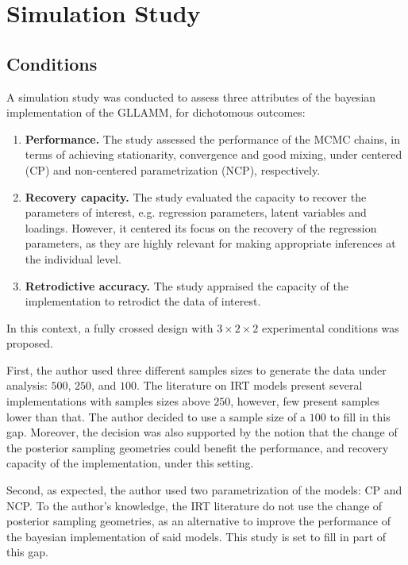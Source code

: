 \chapter{Simulation Study} \label{chap:simulation}

\section{Conditions} \label{sec:conditions}

A simulation study was conducted to assess three attributes of the bayesian implementation of the GLLAMM, for dichotomous outcomes:
%
\begin{enumerate}
	\item \textbf{Performance.} The study assessed the performance of the MCMC chains, in terms of achieving stationarity, convergence and good mixing,  under centered (CP) and non-centered parametrization (NCP), respectively.
	\item \textbf{Recovery capacity.} The study evaluated the capacity to recover the parameters of interest, e.g. regression parameters, latent variables and loadings. However, it centered its focus on the recovery of the regression parameters, as they are highly relevant for making appropriate inferences at the individual level.
	\item \textbf{Retrodictive accuracy.} The study appraised the capacity of the implementation to retrodict the data of interest.
\end{enumerate} 

\noindent In this context, a fully crossed design with $3 \times 2 \times 2$ experimental conditions was proposed. 

First, the author used three different samples sizes to generate the data under analysis: $500$, $250$, and $100$. The literature on IRT models present several implementations with samples sizes above $250$, however, few present samples lower than that. The author decided to use a sample size of a $100$ to fill in this gap. Moreover, the decision was also supported by the notion that the change of the posterior sampling geometries could benefit the performance, and recovery capacity of the implementation, under this setting.

Second, as expected, the author used two parametrization of the models: CP and NCP. To the author's knowledge, the IRT literature do not use the change of posterior sampling geometries, as an alternative to improve the performance of the bayesian implementation of said models. This study is set to fill in part of this gap.

